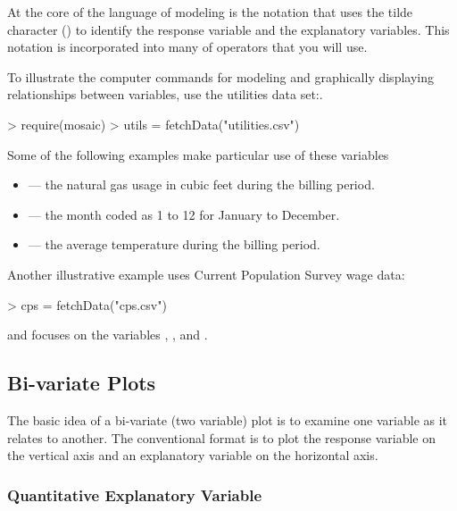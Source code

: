 


At the core of the language of modeling is the notation that uses the
tilde character (\code{~}) to identify the response variable and the
explanatory variables.  This notation is incorporated into many of
operators that you will use.  

To illustrate the computer commands for modeling and graphically displaying
relationships between variables, use the utilities data 
set:\datasetUtilities. 
\begin{Schunk}
\begin{Sinput}
> require(mosaic)
> utils = fetchData("utilities.csv")
\end{Sinput}
\end{Schunk}
Some of the following examples make particular use of these variables 
\begin{itemize}
\item {} --- the natural gas usage in cubic feet during the
  billing period.
\item {} --- the month coded as 1 to 12 for January to December.
\item {} --- the average temperature during the billing period.
\end{itemize}

Another illustrative example uses
Current Population Survey wage data:\datasetCPS
\begin{Schunk}
\begin{Sinput}
> cps = fetchData("cps.csv")
\end{Sinput}
\end{Schunk}
and focuses on the variables , , and .

\subsection{Bi-variate Plots}


The basic idea of a bi-variate (two variable) plot is to examine one
variable as it relates to another.  The conventional format is to plot
the response variable on the vertical axis and an explanatory variable
on the horizontal axis.  

\subsubsection{Quantitative Explanatory Variable}

